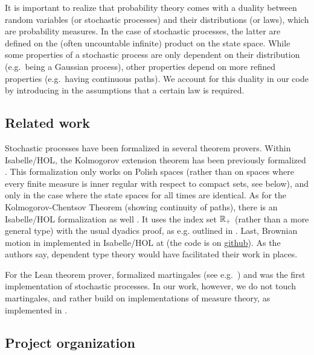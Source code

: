 \documentclass[lean]{Draft}
\begin{document}
It is important to realize that probability theory comes with a duality between random variables (or stochastic processes) and their distributions (or laws), which are probability measures. In the case of stochastic processes, the latter are defined on the (often uncountable infinite) product on the state space. While some properties of a stochastic process are only dependent on their distribution (e.g.\ being a Gaussian process), other properties depend on more refined properties (e.g.\ having continuous paths). We account for this duality in our code by introducing in the assumptions that a certain law is required.



\subsection{Related work}
Stochastic processes have been formalized in several theorem provers.
Within Isabelle/HOL, the Kolmogorov extension theorem has been previously formalized \cite{Immler2012}. This formalization only works on Polish spaces (rather than on spaces where every finite measure is inner regular with respect to compact sets, see below), and only in the case where the state spaces for all times are identical. As for the Kolmogorov-Chentsov Theorem (showing continuity of paths), there is an Isabelle/HOL formalization as well \cite{Kolmogorov_Chentsov-AFP}.
It uses the index set  $\mathbb{R}_+$ (rather than a more general type) with the usual dyadics proof, as e.g. outlined in \cite{kallenberg2021}. Last,
Brownian motion in implemented in Isabelle/HOL at \cite{laursen2024brownian} (the code is on \href{https://github.com/cplaursen/Brownian_Motion}{github}). As the authors say, dependent type theory would have facilitated their work in places.

For the Lean theorem prover, \cite{ying2023formalization} formalized martingales (see e.g.\ \cite{kallenberg2021}) and was the first implementation of stochastic processes. In our work, however, we do not touch martingales, and rather build on implementations of measure theory, as implemented in \cite{mathlib}.


\subsection{Project organization}
\end{document}
